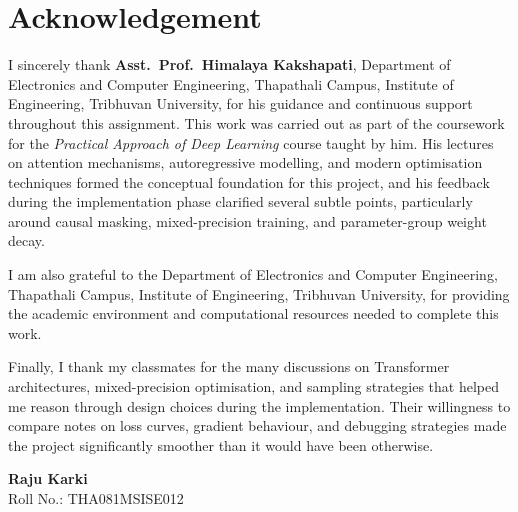 \section*{Acknowledgement}

I sincerely thank \textbf{Asst.\ Prof.\ Himalaya Kakshapati}, 
Department of Electronics and Computer Engineering, Thapathali Campus, 
Institute of Engineering, Tribhuvan University, for his guidance and 
continuous support throughout this assignment. This work was carried out 
as part of the coursework for the \textit{Practical Approach of Deep 
Learning} course taught by him. His lectures on attention mechanisms, 
autoregressive modelling, and modern optimisation techniques formed the 
conceptual foundation for this project, and his feedback during the 
implementation phase clarified several subtle points, particularly around 
causal masking, mixed-precision training, and parameter-group weight decay.

\noindent I am also grateful to the Department of Electronics and Computer 
Engineering, Thapathali Campus, Institute of Engineering, Tribhuvan 
University, for providing the academic environment and computational 
resources needed to complete this work.

\noindent Finally, I thank my classmates for the many discussions on Transformer 
architectures, mixed-precision optimisation, and sampling strategies that 
helped me reason through design choices during the implementation. Their 
willingness to compare notes on loss curves, gradient behaviour, and 
debugging strategies made the project significantly smoother than it would 
have been otherwise.

\vspace{0.25cm}
\noindent
\textbf{Raju Karki}\\
Roll No.: THA081MSISE012